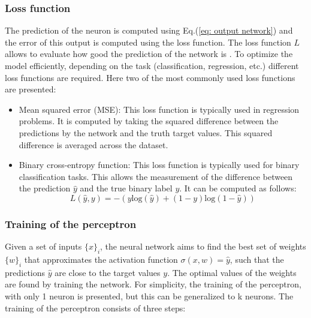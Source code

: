 \subsubsection{Loss function}

The prediction of the neuron is computed using Eq.(\ref{eq: output network}) and the error of this output is computed using the loss function. The loss function $L$  allows to evaluate how good the prediction of the network is \cite{loss_function}. To optimize the model efficiently, depending on the task (classification, regression, etc.) different loss functions are required. Here two of the most commonly used loss functions are presented:

\begin{itemize}
    \item Mean squared error (MSE): This loss function is typically used in regression problems. It is computed by taking the squared difference between the predictions by the network and the truth target values. This squared difference is averaged across the dataset.
    \item Binary cross-entropy function: This loss function is typically used for binary classification tasks. This allows the measurement of the difference between the prediction $\hat{y}$ and the true binary label $y$. It can be computed as follows:
    \begin{equation}
        L(\hat{y},y)=-(y \text{log}(\hat{y}) + (1-y)  \text{log}(1-\hat{y}))    \end{equation}
\end{itemize} 

\subsubsection{Training of the perceptron}

Given a set of inputs $\{x\}_i$, the neural network aims to find the best set of weights $\{w\}_i$ that approximates the activation function $\sigma(x,w)=\hat{y}$, such that the predictions $\hat{y}$ are close to the target values $y$. The optimal values of the weights are found by training the network. For simplicity, the training of the perceptron, with only 1 neuron is presented, but this can be generalized to k neurons. The training of the perceptron consists of three steps:

